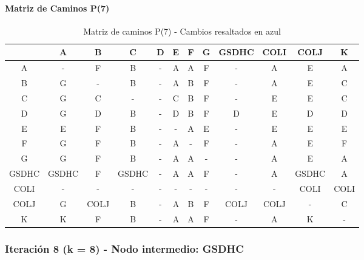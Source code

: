 \documentclass[12pt]{article}
\begin{document}
\paragraph{Matriz de Caminos P(7)}
\begin{table}[h!]
\centering
\begin{tabular}{|c|c|c|c|c|c|c|c|c|c|c|c|}
\hline
 & A & B & C & D & E & F & G & GSDHC & COLI & COLJ & K \\\hline
A & - & F & B & - & A & A & F & - & A & E & A \\\hline
B & \cellcolor{lightblue} G & - & B & - & \cellcolor{lightblue} A & B & F & - & A & E & C \\\hline
C & \cellcolor{lightblue} G & C & - & - & C & B & F & - & E & E & C \\\hline
D & \cellcolor{lightblue} G & D & B & - & D & B & F & D & E & D & D \\\hline
E & E & F & B & - & - & A & E & - & E & E & E \\\hline
F & \cellcolor{lightblue} G & F & B & - & A & - & F & - & A & E & F \\\hline
G & G & F & B & - & A & A & - & - & A & E & A \\\hline
GSDHC & GSDHC & F & GSDHC & - & A & A & F & - & A & GSDHC & A \\\hline
COLI & - & - & - & - & - & - & - & - & - & COLI & COLI \\\hline
COLJ & \cellcolor{lightblue} G & COLJ & B & - & \cellcolor{lightblue} A & B & F & COLJ & COLJ & - & C \\\hline
K & K & F & B & - & A & A & F & - & A & K & - \\\hline
\end{tabular}
\caption{Matriz de caminos P(7) - Cambios resaltados en azul}
\end{table}

\subsubsection{Iteración 8 (k = 8) - Nodo intermedio: GSDHC}
\end{document}
